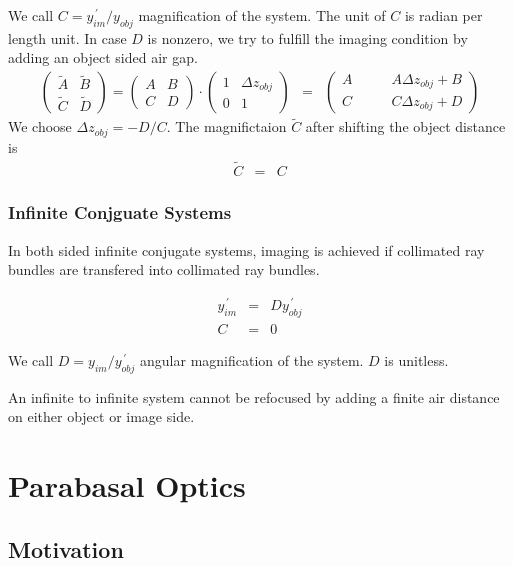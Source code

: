\documentclass[12pt,a4paper,twoside,openright,BCOR10mm,headsepline,titlepage,abstracton,chapterprefix,final]{scrreprt}
\begin{document}
We call $C = y^{\,\prime}_{im} / y_{obj}$ magnification of the system.
The unit of $C$ is radian per length unit.
In case $D$ is nonzero, we try to fulfill the imaging condition by adding an object sided air gap.
\begin{eqnarray}
 \begin{pmatrix}
  \tilde{A} & \tilde{B} \\ \tilde{C} & \tilde{D}
 \end{pmatrix}
 =
 \begin{pmatrix}
  A & B \\ C & D
 \end{pmatrix}
 \cdot
  \begin{pmatrix}
  1 & \Delta z_{obj} \\ 0 & 1
 \end{pmatrix}
 &=&
 \begin{pmatrix}
  A\qquad & A \Delta z_{obj} + B \\
  C\qquad & C \Delta z_{obj} + D 
 \end{pmatrix}
\end{eqnarray}
We choose $\Delta z_{obj} = - D / C$.
The magnifictaion $\tilde{C}$ after shifting the object distance is
\begin{eqnarray}
 \tilde{C} &=& C 
\end{eqnarray}


\subsubsection{Infinite Conjguate Systems}
In both sided infinite conjugate systems, imaging is achieved if collimated ray bundles are transfered into collimated ray bundles.

\begin{eqnarray}
   y^{\,\prime}_{im} &=& D y^{\,\prime}_{obj} \\
   C &=& 0
\end{eqnarray}

We call $D = y_{im} / y^{\,\prime}_{obj}$ angular magnification of the system.
$D$ is unitless.

An infinite to infinite system cannot be refocused by adding a finite air distance on either object or image side.

\section{Parabasal Optics}

\subsection{Motivation}
\end{document}
